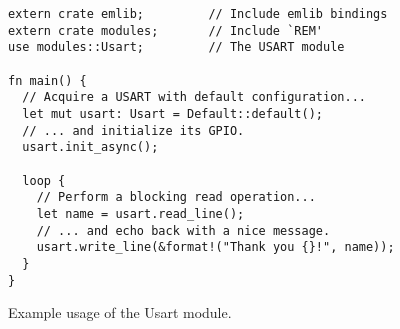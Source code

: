 \begin{listing}[H]
  \begin{verbatim}
extern crate emlib;         // Include emlib bindings
extern crate modules;       // Include `REM'
use modules::Usart;         // The USART module

fn main() {
  // Acquire a USART with default configuration...
  let mut usart: Usart = Default::default();
  // ... and initialize its GPIO.
  usart.init_async();

  loop {
    // Perform a blocking read operation...
    let name = usart.read_line();
    // ... and echo back with a nice message.
    usart.write_line(&format!("Thank you {}!", name));
  }
}
  \end{verbatim}
  \caption{Example usage of the Usart module.}
  \label{lst:usart_abstraction}
\end{listing}
